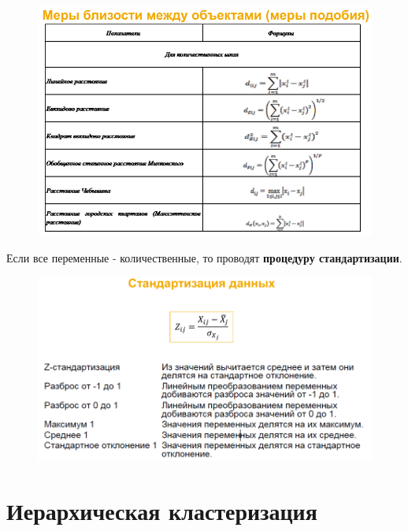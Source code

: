 \documentclass{beamer}
\begin{document}
\begin{frame}	
	\begin{figure}[h]
		\centering
		\includegraphics[scale=0.5]{images/lec07-pic09.png}
	\end{figure}
\end{frame}

\begin{frame}
	Если все переменные - количественные, то проводят \textbf{процедуру стандартизации}.
	\begin{figure}[h]
		\centering
		\includegraphics[scale=0.5]{images/lec07-pic24.png}
	\end{figure}
\end{frame}

\section{Иерархическая кластеризация}
\end{document}
